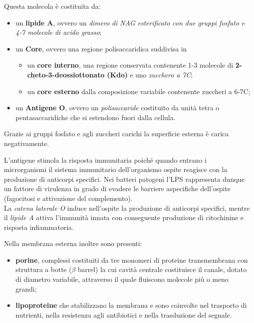 \documentclass[11pt]{book}
\begin{document}
Questa molecola è costituita da:
\begin{itemize}
\item un \textbf{lipide A}, ovvero un \emph{dimero di NAG esterificato con due gruppi fosfato e 4-7 molecole di acido grasso};
\item un \textbf{Core}, ovvero una regione polisaccaridica suddivisa in 
\begin{itemize}
\item un \textbf{core interno}, una regione conservata contenente 1-3 molecole di \textbf{2-cheto-3-deossiottonato (Kdo)} e uno \emph{zucchero a 7C};
\item un \textbf{core esterno} dalla composizione variabile contenente zuccheri a 6-7C; 
\end{itemize}
\item un \textbf{Antigene O}, ovvero un \emph{polisaccaride} costituito da unità tetra o pentasaccaridiche che si estendono fuori dalla cellula.
\end{itemize}

Grazie ai gruppi fosfato e agli zuccheri carichi la superficie esterna è carica negativamente.

\vspace{1em}
L'antigene stimola la risposta immunitaria poiché quando entrano i microrganismi il sistema immunitario dell'organismo ospite reagisce con la produzione di anticorpi specifici.
Nei batteri patogeni l’LPS rappresenta dunque un fattore di virulenza in grado di evadere le barriere aspecifiche dell’ospite (fagocitosi e attivazione del complemento).\\
La \emph{catena laterale O} induce nell’ospite la produzione di anticorpi specifici, mentre il \emph{lipide A} attiva l’immunità innata con conseguente produzione di citochinine e risposta infiammatoria.

\clearpage
Nella membrana esterna inoltre sono presenti:
\begin{itemize}
\item \textbf{porine}, complessi costituiti da tre monomeri di proteine transmembrana con struttura a botte ($\beta$ barrel) la cui cavità centrale costituisce il canale, dotato di diametro variabile, attraverso il quale fluiscono molecole più o meno grandi;
\item \textbf{lipoproteine} che stabilizzano la membrana e sono coinvolte nel trasporto di nutrienti, nella resistenza agli antibiotici e nella trasduzione del segnale.
\end{itemize}
\end{document}
